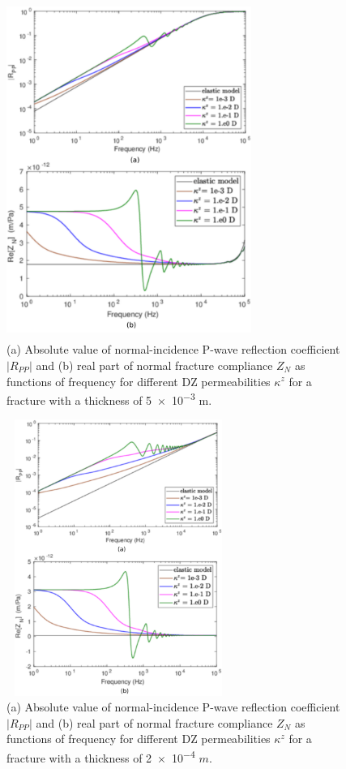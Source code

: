 \documentclass[draft]{agujournal2019}
\begin{document}
\begin{figure}
\centering
        \includegraphics[width=80mm, height=110mm]{Figure7.pdf}
\caption {(a) Absolute value of normal-incidence P-wave reflection coefficient $|R_{PP}|$ and (b) real part of normal fracture compliance $Z_N$ as functions of frequency for different DZ permeabilities $\kappa^z$ for a fracture with a thickness of \num{5e-3} m.}
\label{fig:7}
\end{figure}

\begin{figure}
\centering
        \includegraphics[width=73mm, height=90mm]{Figure8.pdf}
\caption {(a) Absolute value of normal-incidence P-wave reflection coefficient $|R_{PP}|$ and (b) real part of normal fracture compliance $Z_N$ as functions of frequency for different DZ permeabilities $\kappa^z$ for a fracture with a thickness of \num{2e-4} $m$.}
\label{fig:8}
\end{figure}
\end{document}
